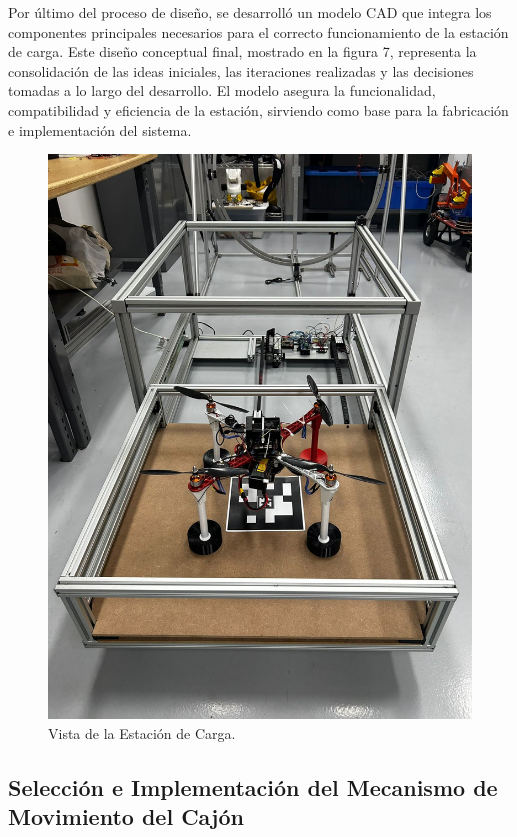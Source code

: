 Por último del proceso de diseño, se desarrolló un modelo CAD que integra los componentes principales necesarios para el correcto funcionamiento de la estación de carga. Este diseño conceptual final, mostrado en la figura 7, representa la consolidación de las ideas iniciales, las iteraciones realizadas y las decisiones tomadas a lo largo del desarrollo. El modelo asegura la funcionalidad, compatibilidad y eficiencia de la estación, sirviendo como base para la fabricación e implementación del sistema.

        \begin{figure}[htpb]
            \centering
            \includegraphics[width=1\textwidth]{pictures/ESTACION_FINAL.jpg}
            \caption{Vista de la Estación de Carga.}
            \label{fig:etiqueta}
        \end{figure}

\subsection{Selección e Implementación del Mecanismo de Movimiento del Cajón}

